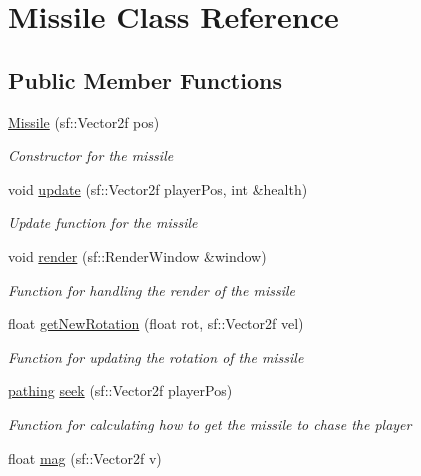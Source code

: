 \hypertarget{class_missile}{}\section{Missile Class Reference}
\label{class_missile}
\subsection*{Public Member Functions}
\begin{DoxyCompactItemize}
\item 
\mbox{\hyperlink{class_missile_afeeea0fd5a57b2fa5edfdccbb6ffeba1}{Missile}} (sf\+::\+Vector2f pos)
\begin{DoxyCompactList}\small\item\em Constructor for the missile \end{DoxyCompactList}\item 
void \mbox{\hyperlink{class_missile_afd7036f6ab20eabb14920dfe0bc8944d}{update}} (sf\+::\+Vector2f player\+Pos, int \&health)
\begin{DoxyCompactList}\small\item\em Update function for the missile \end{DoxyCompactList}\item 
void \mbox{\hyperlink{class_missile_a882289a30763d8307727a674655c7367}{render}} (sf\+::\+Render\+Window \&window)
\begin{DoxyCompactList}\small\item\em Function for handling the render of the missile \end{DoxyCompactList}\item 
float \mbox{\hyperlink{class_missile_a286613c45f833883801ee1b90f841e37}{get\+New\+Rotation}} (float rot, sf\+::\+Vector2f vel)
\begin{DoxyCompactList}\small\item\em Function for updating the rotation of the missile \end{DoxyCompactList}\item 
\mbox{\hyperlink{structpathing}{pathing}} \mbox{\hyperlink{class_missile_a9a79e1c2815d3d97810a810286e6cec4}{seek}} (sf\+::\+Vector2f player\+Pos)
\begin{DoxyCompactList}\small\item\em Function for calculating how to get the missile to chase the player \end{DoxyCompactList}\item 
float \mbox{\hyperlink{class_missile_a81919e4b6e417b114a61e88fa608c6e5}{mag}} (sf\+::\+Vector2f v)

\end{DoxyCompactItemize}
